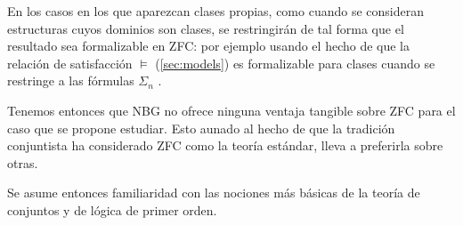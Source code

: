 En los casos en los que aparezcan clases propias, como cuando se consideran estructuras
cuyos dominios son clases, se restringirán de tal forma que el resultado sea formalizable
en ZFC: por ejemplo usando el hecho de que la relación de satisfacción $\models$ (\cref{sec:models})
es formalizable para clases cuando se restringe a las fórmulas $\Sigma_n$
\autocite[pág. 186]{jech_set_2003}.

Tenemos entonces que NBG no ofrece ninguna ventaja tangible sobre ZFC
para el caso que se propone estudiar.
Esto aunado al hecho de que la tradición conjuntista ha considerado ZFC
como la teoría estándar, lleva a preferirla sobre otras.

Se asume entonces familiaridad con las nociones más básicas de la teoría de conjuntos
y de lógica de primer orden. 

